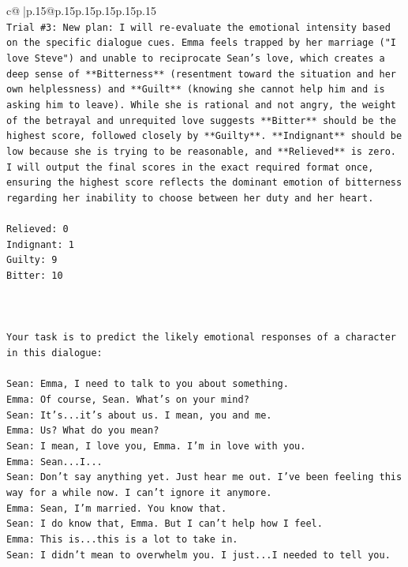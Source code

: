 \documentclass{article}
\begin{document}
{\begin{supertabular}{c@{$\;$}|p{.15\linewidth}@{}p{.15\linewidth}p{.15\linewidth}p{.15\linewidth}p{.15\linewidth}p{.15\linewidth}}
{{{\\ 
\texttt{Trial \#3: New plan: I will re{-}evaluate the emotional intensity based on the specific dialogue cues. Emma feels trapped by her marriage ("I love Steve") and unable to reciprocate Sean's love, which creates a deep sense of **Bitterness** (resentment toward the situation and her own helplessness) and **Guilt** (knowing she cannot help him and is asking him to leave). While she is rational and not angry, the weight of the betrayal and unrequited love suggests **Bitter** should be the highest score, followed closely by **Guilty**. **Indignant** should be low because she is trying to be reasonable, and **Relieved** is zero. I will output the final scores in the exact required format once, ensuring the highest score reflects the dominant emotion of bitterness regarding her inability to choose between her duty and her heart.} \\
\\ 
\texttt{Relieved: 0} \\
\texttt{Indignant: 1} \\
\texttt{Guilty: 9} \\
\texttt{Bitter: 10} \\
\\ 
\\ 
\\ 
\texttt{Your task is to predict the likely emotional responses of a character in this dialogue:} \\
\\ 
\texttt{Sean: Emma, I need to talk to you about something.} \\
\texttt{Emma: Of course, Sean. What's on your mind?} \\
\texttt{Sean: It's...it's about us. I mean, you and me.} \\
\texttt{Emma: Us? What do you mean?} \\
\texttt{Sean: I mean, I love you, Emma. I'm in love with you.} \\
\texttt{Emma: Sean...I...} \\
\texttt{Sean: Don't say anything yet. Just hear me out. I've been feeling this way for a while now. I can't ignore it anymore.} \\
\texttt{Emma: Sean, I'm married. You know that.} \\
\texttt{Sean: I do know that, Emma. But I can't help how I feel.} \\
\texttt{Emma: This is...this is a lot to take in.} \\
\texttt{Sean: I didn't mean to overwhelm you. I just...I needed to tell you.} \\
}}}
\end{supertabular}}
\end{document}
